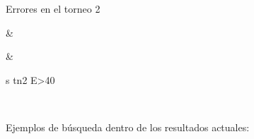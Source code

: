 \documentclass[letterpaper,10pt,spanish]{sphinxmanual}
\begin{document}
\begin{savenotes}
\begin{tabular}[t]{}
\begin{varwidth}[t]{}
\sphinxAtStartPar
Errores en el torneo 2
\sphinxbeforeendvarwidth
\end{varwidth}%
&\begin{varwidth}[t]{}
\sphinxbeforeendvarwidth
\end{varwidth}%
&\begin{varwidth}[t]{}
\sphinxAtStartPar
s tn2 E>40
\sphinxbeforeendvarwidth
\end{varwidth}%
\\
\sphinxbottomrule
\end{tabular}
\sphinxtableafterendhook\par
\sphinxattableend\end{savenotes}

\sphinxAtStartPar
Ejemplos de búsqueda dentro de los resultados actuales:
\end{document}

